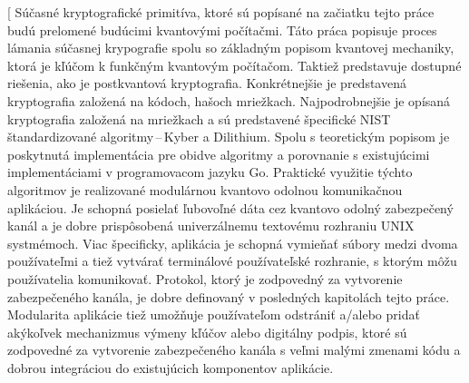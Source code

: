 
\date{7.\,6.\,2023}


\abstract[%
  Súčasné kryptografické primitíva, ktoré sú popísané na začiatku tejto práce budú prelomené budúcimi kvantovými počítačmi. Táto práca popisuje proces lámania súčasnej krypografie spolu so základným popisom kvantovej mechaniky, ktorá je kľúčom k funkčným kvantovým počítačom. Taktiež predstavuje dostupné riešenia, ako je postkvantová kryptografia. Konkrétnejšie je predstavená kryptografia založená na kódoch, hašoch mriežkach. Najpodrobnejšie je opísaná kryptografia založená na mriežkach a sú predstavené špecifické NIST štandardizované algoritmy\,--\,Kyber a Dilithium. Spolu s teoretickým popisom je poskytnutá implementácia pre obidve algoritmy a porovnanie s existujúcimi implementáciami v programovacom jazyku Go. Praktické využitie týchto algoritmov je realizované modulárnou kvantovo odolnou komunikačnou aplikáciou. Je schopná posielať ľubovoľné dáta cez kvantovo odolný zabezpečený kanál a je dobre prispôsobená univerzálnemu textovému rozhraniu UNIX systmémoch. Viac špecificky, aplikácia je schopná vymieňať súbory medzi dvoma používateľmi a tiež vytvárať terminálové používateľské rozhranie, s ktorým môžu používatelia komunikovať. Protokol, ktorý je zodpovedný za vytvorenie zabezpečeného kanála, je dobre definovaný v posledných kapitolách tejto práce. Modularita aplikácie tiež umožňuje používateľom odstrániť a/alebo pridať akýkoľvek mechanizmus výmeny kľúčov alebo digitálny podpis, ktoré sú zodpovedné za vytvorenie zabezpečeného kanála s veľmi malými zmenami kódu a dobrou integráciou do existujúcich komponentov aplikácie.
